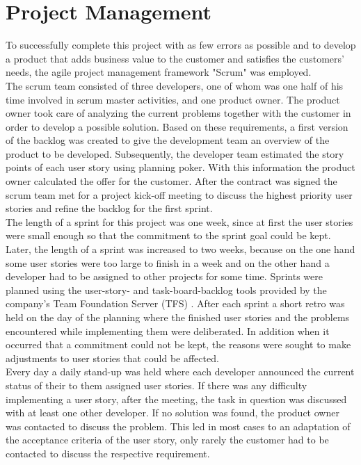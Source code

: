\documentclass[Bachelor,BIF,english]{twbook}
\begin{document}
\section{Project Management}
To successfully complete this project with as few errors as possible and to develop a product that adds business value to the customer and satisfies the customers' needs, the agile project management framework "Scrum" \cite{Scrum} was employed. 
\\[\baselineskip]
The scrum team consisted of three developers, one of whom was one half of his time involved in scrum master activities, and one product owner. The product owner took care of analyzing the current problems together with the customer in order to develop a possible solution. Based on these requirements, a first version of the backlog was created to give the development team an overview of the product to be developed. Subsequently, the developer team estimated the story points of each user story using planning poker. With this information the product owner calculated the offer for the customer. After the contract was signed the scrum team met for a project kick-off meeting to discuss the highest priority user stories and refine the backlog for the first sprint.
\\[\baselineskip]
The length of a sprint for this project was one week, since at first the user stories were small enough so that the commitment to the sprint goal could be kept. Later, the length of a sprint was increased to two weeks, because on the one hand some user stories were too large to finish in a week and on the other hand a developer had to be assigned to other projects for some time. Sprints were planned using the user-story- and task-board-backlog tools provided by the company's Team Foundation Server (TFS) \cite{TFS}. After each sprint a short retro was held on the day of the planning where the finished user stories and the problems encountered while implementing them were deliberated. In addition when it occurred that a commitment could not be kept, the reasons were sought to make adjustments to user stories that could be affected. 
\\[\baselineskip]
Every day a daily stand-up was held where each developer announced the current status of their to them assigned user stories. If there was any difficulty implementing a user story, after the meeting, the task in question was discussed with at least one other developer. If no solution was found, the product owner was contacted to discuss the problem. This led in most cases to an adaptation of the acceptance criteria of the user story, only rarely the customer had to be contacted to discuss the respective requirement. 
\end{document}

